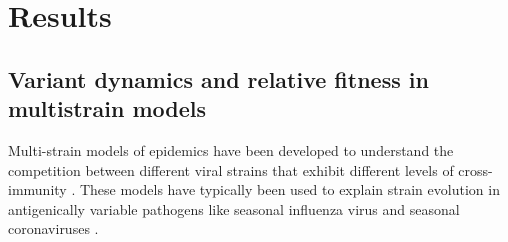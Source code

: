 \documentclass[11pt,oneside,letterpaper]{article}
\begin{document}
%



\section*{Results}

\subsection*{Variant dynamics and relative fitness in multistrain models}

Multi-strain models of epidemics have been developed to understand the competition between different viral strains that exhibit different levels of cross-immunity \cite{Gog2002, bedford2012canalization}.
These models have typically been used to explain strain evolution in antigenically variable pathogens like seasonal influenza virus \cite{bedford2014integrating} and seasonal coronaviruses \cite{Kistler2021, Eguia2021}.
\end{document}

